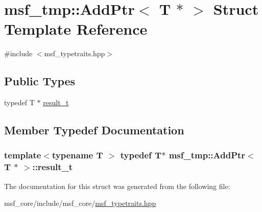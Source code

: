 \hypertarget{structmsf__tmp_1_1AddPtr_3_01T_01_5_01_4}{\section{msf\-\_\-tmp\-:\-:Add\-Ptr$<$ T $\ast$ $>$ Struct Template Reference}
\label{structmsf__tmp_1_1AddPtr_3_01T_01_5_01_4}
}


{\ttfamily \#include $<$msf\-\_\-typetraits.\-hpp$>$}

\subsection*{Public Types}
\begin{DoxyCompactItemize}
\item 
typedef T $\ast$ \hyperlink{structmsf__tmp_1_1AddPtr_3_01T_01_5_01_4_ad665c44a1e3f8154bb2033e80095a8cb}{result\-\_\-t}
\end{DoxyCompactItemize}


\subsection{Member Typedef Documentation}
\hypertarget{structmsf__tmp_1_1AddPtr_3_01T_01_5_01_4_ad665c44a1e3f8154bb2033e80095a8cb}{
\subsubsection[{result\-\_\-t}]{\setlength{\rightskip}{0pt plus 5cm}template$<$typename T $>$ typedef T$\ast$ {\bf msf\-\_\-tmp\-::\-Add\-Ptr}$<$ T $\ast$ $>$\-::{\bf result\-\_\-t}}}\label{structmsf__tmp_1_1AddPtr_3_01T_01_5_01_4_ad665c44a1e3f8154bb2033e80095a8cb}


The documentation for this struct was generated from the following file\-:\begin{DoxyCompactItemize}
\item 
msf\-\_\-core/include/msf\-\_\-core/\hyperlink{msf__typetraits_8hpp}{msf\-\_\-typetraits.\-hpp}\end{DoxyCompactItemize}
